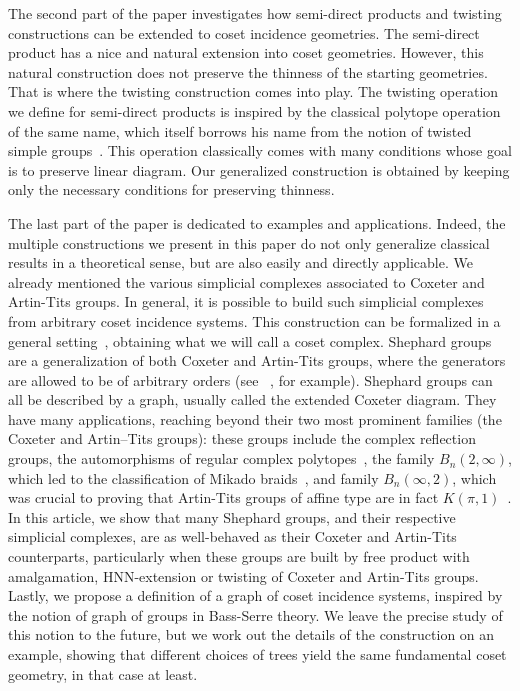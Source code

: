 \documentclass[11pt,letterpaper]{amsart}
\begin{document}
The second part of the paper investigates how semi-direct products and twisting constructions can be extended to coset incidence geometries. The semi-direct product has a nice and natural extension into coset geometries. However, this natural construction does not preserve the thinness of the starting geometries. That is where the twisting construction comes into play. The twisting operation we define for semi-direct products is inspired by the classical polytope operation of the same name, which itself borrows his name from the notion of twisted simple groups~\cite[Chapter 8]{ARP}. This operation classically comes with many conditions whose goal is to preserve linear diagram. Our generalized construction is obtained by keeping only the necessary conditions for preserving thinness.

The last part of the paper is dedicated to examples and applications. Indeed, the multiple constructions we present in this paper do not only generalize classical results in a theoretical sense, but are also easily and directly applicable. We already mentioned the various simplicial complexes associated to Coxeter and Artin-Tits groups. In general, it is possible to build such simplicial complexes from arbitrary coset incidence systems.
This construction can be formalized in a general setting~\cite{Handbook}, obtaining what we will call a coset complex.
Shephard groups~\cite{Kapovich1998,Goldman2024} are a generalization of both Coxeter and Artin-Tits groups, where the generators are allowed to be of arbitrary orders (see ~\cite{Kapovich1998}, for example).
Shephard groups can all be described by a graph, usually called the extended Coxeter diagram.
They have many applications, reaching beyond their two most prominent families (the Coxeter and Artin–Tits groups): these groups include the complex reflection groups, the automorphisms of regular complex polytopes~\cite{ShephardTodd1954}, the family $B_n(2,\infty)$, which led to the classification of Mikado braids~\cite{Baumeister2017}, and family $B_n(\infty,2)$, which was crucial to proving that Artin-Tits groups of affine type are in fact $K(\pi,1)$~\cite{McCammond2017,Paolini2020}.
In this article, we show that many Shephard groups, and their respective simplicial complexes, are as well-behaved as their Coxeter and Artin-Tits counterparts, particularly when these groups are built by free product with amalgamation, HNN-extension or twisting of Coxeter and Artin-Tits groups. Lastly, we propose a definition of a graph of coset incidence systems, inspired by the notion of graph of groups in Bass-Serre theory. We leave the precise study of this notion to the future, but we work out the details of the construction on an example, showing that different choices of trees yield the same fundamental coset geometry, in that case at least.
\end{document}
